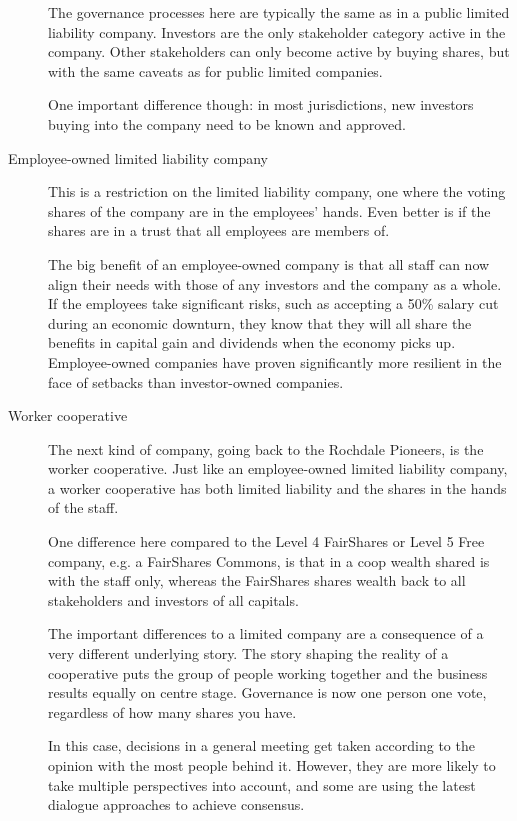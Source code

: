 \begin{description}
The governance processes here are typically the same as in a public limited liability company. Investors are the only stakeholder category active in the company. Other stakeholders can only become active by buying shares, but with the same caveats as for public limited companies.


One important difference though: in most jurisdictions, new investors buying into the company need to be known and approved.


\item[Employee-owned limited liability company]
This is a restriction on the limited liability company, one where the voting shares of the company are in the employees’ hands. Even better is if the shares are in a trust that all employees are members of.


The big benefit of an employee-owned company is that all staff can now align their needs with those of any investors and the company as a whole. If the employees take significant risks, such as accepting a 50\% salary cut during an economic downturn, they know that they will all share the benefits in capital gain and dividends when the economy picks up. Employee-owned companies have proven significantly more resilient in the face of setbacks than investor-owned companies.


\item[Worker cooperative]
The next kind of company, going back to the Rochdale Pioneers, is the worker cooperative. Just like an employee-owned limited liability company, a worker cooperative has both limited liability and the shares in the hands of the staff.  


One difference here compared to the Level 4 FairShares or Level 5 Free company, e.g. a FairShares Commons, is that in a coop wealth shared is with the staff only, whereas the FairShares shares wealth back to all stakeholders and investors of all capitals. 


The important differences to a limited company are a consequence of a very different underlying story. The story shaping the reality of a cooperative puts the group of people working together and the business results equally on centre stage. Governance is now one person one vote, regardless of how many shares you have. 


In this case, decisions in a general meeting get taken according to the opinion with the most people behind it. However, they are more likely to take multiple perspectives into account, and some are using the latest dialogue approaches to achieve consensus.



\end{description}
